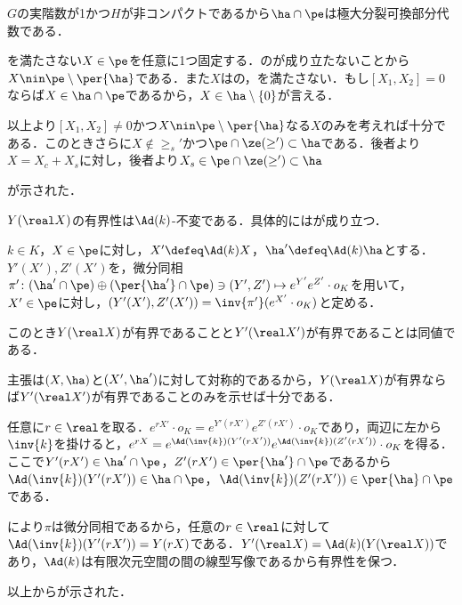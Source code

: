 \begin{npfwn}
\begin{enumerate}
    $G$の実階数が1かつ$H$が非コンパクトであるから$\ha\cap\pe$は極大分裂可換部分代数である．
    
    を満たさない$X\in \pe$を任意に1つ固定する．のが成り立たないことから$X\nin \pe\setminus\per{\ha}$である．また$X$はの，を満たさない．もし$[X_1, X_2] = 0 $ ならば$X\in\ha\cap \pe $であるから，$X\in \ha\setminus\{0\} $が言える．

    以上より$[X_1,X_2] \neq 0$かつ$X\nin \pe\setminus\per{\ha}$なる$X$のみを考えれば十分である．このときさらに$X\nin \ge_{s}' $かつ$\pe\cap\ze(\ge')\subset \ha $である．後者より$X  = X_c + X_s $に対し，後者より$X_s\in \pe\cap\ze(\ge')\subset \ha $
    
    が示された．
  \end{enumerate}  
\end{npfwn}

$Y(\real X) $の有界性は$\Ad(k) $-不変である．具体的にはが成り立つ．
\begin{lem}\label{lem:1101}
  $k\in K$，$X\in \pe$に対し，$X'\defeq \Ad(k)X $，$\ha'\defeq \Ad(k)\ha $とする．$Y'(X'), Z'(X') $を，微分同相$\pi'\colon (\ha'\cap \pe)\oplus (\per{\ha'}\cap \pe)\ni (Y',Z')\mapsto e^{Y'}e^{Z'}\cdot o_K  $を用いて，$X'\in \pe$に対し，$(Y'(X'), Z'(X')) = \inv{\pi'}(e^{X'}\cdot o_K) $と定める．

  このとき$Y(\real X)$が有界であることと$ Y'(\real X') $が有界であることは同値である．
\end{lem}

\begin{npfwn}
  主張は$(X,\ha) $と$(X',\ha')$に対して対称的であるから，$Y(\real X) $が有界ならば$Y'(\real X') $が有界であることのみを示せば十分である．

  任意に$r\in \real$を取る．$e^{rX'}\cdot o_K = e^{Y'(r X')}e^{Z'(r X')}\cdot o_K  $であり，両辺に左から$\inv{k} $を掛けると，$e^{r X} = e^{\Ad(\inv{k})( Y'(r X'))}e^{\Ad(\inv{k})( Z'(r X'))}\cdot o_K  $を得る．ここで$Y'(rX')\in \ha'\cap \pe $，$Z'(r X')\in \per{\ha'}\cap \pe $であるから$\Ad(\inv{k})(Y'(r X'))\in \ha\cap \pe $，$\Ad(\inv{k})(Z'(r X')) \in \per{\ha}\cap \pe $である．

  により$\pi$は微分同相であるから，任意の$r\in \real$に対して$\Ad(\inv{k})(Y'(r X')) = Y(rX)  $である．$Y'(\real X) = \Ad(k)(Y(\real X))  $であり，$\Ad(k) $は有限次元空間の間の線型写像であるから有界性を保つ．

  以上からが示された．  
\end{npfwn}


